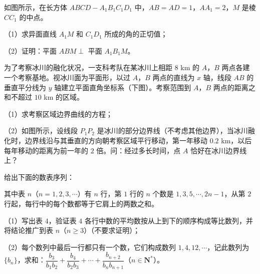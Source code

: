 \begingroup
\renewenvironment{question}{\Needspace{0.5\textheight}}{}
\begin{question}
如图所示，在长方体 $ABCD-A_1B_1C_1D_1$ 中，$AB=AD=1$，$AA_1=2$，$M$ 是棱 $CC_1$ 的中点。

（1）求异面直线 $A_1M$ 和 $C_1D_1$ 所成的角的正切值；

（2）证明：平面 $ABM\perp$ 平面 $A_1B_1M$。
\nopagebreak[4]
\begin{center}\end{center}
\nopagebreak[4]
\Needspace{0.4\textheight}
\end{question}
\endgroup
\begingroup
\renewenvironment{question}{\Needspace{0.5\textheight}}{}
\begin{question}
为了考察冰川的融化状况，一支科考队在某冰川上相距 $8$ km 的 $A$，$B$ 两点各建一个考察基地。视冰川面为平面形，以过 $A$，$B$ 两点的直线为 $x$ 轴，线段 $AB$ 的垂直平分线为 $y$ 轴建立平面直角坐标系（下图）。考察范围到 $A$，$B$ 两点的距离之和不超过 $10$ km 的区域。

（1）求考察区域边界曲线的方程；

（2）如图所示，设线段 $P_1P_2$ 是冰川的部分边界线（不考虑其他边界），当冰川融化时，边界线沿与其垂直的方向朝考察区域平行移动，第一年移动 $0.2$ km，以后每年移动的距离为前一年的 $2$ 倍。问：经过多长时间，点 $A$ 恰好在冰川边界线上？
\nopagebreak[4]
\begin{center}\end{center}
\nopagebreak[4]
\Needspace{0.4\textheight}
\end{question}
\endgroup
\begingroup
\renewenvironment{question}{\Needspace{0.5\textheight}}{}
\begin{question}
给出下面的数表序列：
\nopagebreak[4]
\begin{center}\end{center}
\nopagebreak[4]
其中表 $n$（$n=1,2,3,\cdots$）有 $n$ 行，第 $1$ 行的 $n$ 个数是 $1,3,5,\cdots,2n-1$，从第 $2$ 行起，每行中的每个数都等于它肩上的两数之和。

（1）写出表 $4$，验证表 $4$ 各行中数的平均数按从上到下的顺序构成等比数列，并将结论推广到表 $n$（$n\geqslant3$）（不要求证明）；

（2）每个数列中最后一行都只有一个数，它们构成数列 $1,4,12,\cdots$，记此数列为 $\{b_n\}$，求和：$\dfrac{b_3}{b_1b_2}+\dfrac{b_4}{b_2b_3}+\cdots+\dfrac{b_{n+2}}{b_nb_{n+1}}$（$n\in\mathbf N^*$）。

\end{question}
